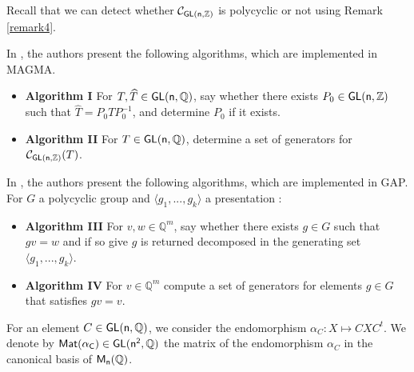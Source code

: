 \documentclass[a4paper,11pt]{article}
\theoremstyle{definition}
\newcommand{\Z}{\mathbb Z}
\newcommand{\Q}{\mathbb Q}
\newcommand{\C}{\mathcal C}
\def \GL{\sf{GL}}
\newcommand{\M}{\sf{M}}
\newcommand{\Mat}{\sf{Mat}}
\begin{document}
Recall that we can detect whether $\mathcal{C}_{\GL(n,\Z)}$ is polycyclic or not using Remark \ref{remark4}.


In  \cite{eick2019conjugacy}, the authors present the following algorithms, which are implemented in MAGMA.
\begin{itemize}
    \item \textbf{Algorithm I} For $T, \widehat{T} \in \GL(n,\Q)$, say whether there exists $P_0\in \GL(n,\Z)$ such that $\widehat{T}=P_0TP_0^{-1}$, and determine $P_0$ if it exists.
    \item \textbf{Algorithm II} For $T \in \GL(n,\Q)$, determine a set of generators for $\C_{\GL(n,\Z)}(T)$.
    
\end{itemize}

In \cite{eick2003orbit},  the authors present the following algorithms, which are implemented in GAP. \newline
For $G$ a polycyclic group and $\langle g_1,...,g_k \rangle $ a presentation : 
\begin{itemize}
    \item \textbf{Algorithm III} For $v,w \in \Q^m$, say whether there exists $g \in G$ such that $gv =w$ and if so give $g$ is returned decomposed in the generating set $\langle g_1,...,g_k \rangle$.
    \item \textbf{Algorithm IV} For $v \in \Q^m$ compute a set of generators for elements $g\in G$ that satisfies $gv=v$.
\end{itemize}

For an element $C \in \GL(n,\Q)$, we consider the endomorphism $\alpha_C : X \longmapsto CXC^t$. We denote by $\Mat(\alpha_C) \in \GL(n^2,\Q)$ the matrix of the endomorphism $\alpha_C$ in the canonical basis of $\M_n(\Q)$.
\end{document}

